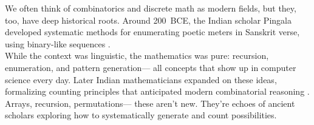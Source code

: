We often think of combinatorics and discrete math as modern fields, but they, too, have deep historical roots. Around 200~BCE, the Indian scholar Pingala developed systematic methods for enumerating poetic meters in Sanskrit verse, using binary-like sequences \cite{ukessays_indian_math}.\\

While the context was linguistic, the mathematics was pure: recursion, enumeration, and pattern generation---%
all concepts that show up in computer science every day. Later Indian mathematicians expanded on these ideas, formalizing counting principles that anticipated modern combinatorial reasoning \cite{mj_college}.\\

Arrays, recursion, permutations---%
these aren’t new. They’re echoes of ancient scholars exploring how to systematically generate and count possibilities.